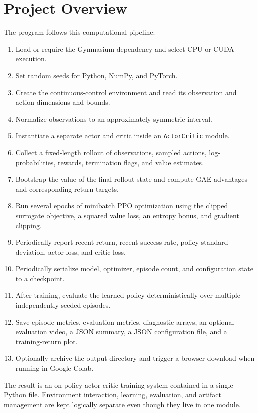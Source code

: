 \documentclass[11pt,a4paper]{article}
\begin{document}
\section{Project Overview}
The program follows this computational pipeline:
\begin{enumerate}
    \item Load or require the Gymnasium dependency and select CPU or CUDA execution.
    \item Set random seeds for Python, NumPy, and PyTorch.
    \item Create the continuous-control environment and read its observation and action dimensions and bounds.
    \item Normalize observations to an approximately symmetric interval.
    \item Instantiate a separate actor and critic inside an \texttt{ActorCritic} module.
    \item Collect a fixed-length rollout of observations, sampled actions, log-probabilities, rewards, termination flags, and value estimates.
    \item Bootstrap the value of the final rollout state and compute GAE advantages and corresponding return targets.
    \item Run several epochs of minibatch PPO optimization using the clipped surrogate objective, a squared value loss, an entropy bonus, and gradient clipping.
    \item Periodically report recent return, recent success rate, policy standard deviation, actor loss, and critic loss.
    \item Periodically serialize model, optimizer, episode count, and configuration state to a checkpoint.
    \item After training, evaluate the learned policy deterministically over multiple independently seeded episodes.
    \item Save episode metrics, evaluation metrics, diagnostic arrays, an optional evaluation video, a JSON summary, a JSON configuration file, and a training-return plot.
    \item Optionally archive the output directory and trigger a browser download when running in Google Colab.
\end{enumerate}

The result is an on-policy actor-critic training system contained in a single Python file. Environment interaction, learning, evaluation, and artifact management are kept logically separate even though they live in one module.
\end{document}
